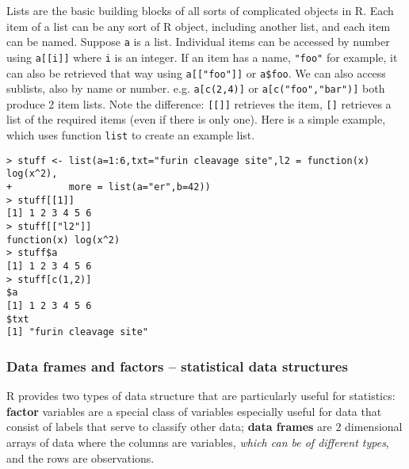 \documentclass[10pt] {article}
\theoremstyle{definition}
\begin{document}
Lists are the basic building blocks of all sorts of complicated objects in R. Each item of a list can be any sort of R object, including another list, and each item can be named. Suppose {\tt a} is a list. Individual items can be accessed by number using \lstinline+a[[i]]+ where {\tt i} is an integer. If an item has a name, \lstinline+"foo"+ for example, it can also be retrieved that way using \lstinline+a[["foo"]]+ or \lstinline+a$foo+. We can also access sublists, also by name or number. e.g. \lstinline+a[c(2,4)]+ or \lstinline+a[c("foo","bar")]+ both produce 2 item lists. Note the difference: \lstinline+[[]]+ retrieves the item, \lstinline+[]+ retrieves a list of the required items (even if there is only one). Here is a simple example, which uses function {\tt list} to create an example list.
\begin{lstlisting}
> stuff <- list(a=1:6,txt="furin cleavage site",l2 = function(x) log(x^2),
+          more = list(a="er",b=42))
> stuff[[1]]
[1] 1 2 3 4 5 6
> stuff[["l2"]]
function(x) log(x^2)
> stuff$a
[1] 1 2 3 4 5 6
> stuff[c(1,2)]
$a
[1] 1 2 3 4 5 6
$txt
[1] "furin cleavage site"
\end{lstlisting}  

\subsubsection{Data frames and factors -- statistical data structures \label{sec:factors}}

R provides two types of data structure that are particularly useful for statistics: {\bf factor} variables are a special class of variables especially useful for data that consist of labels that serve to classify other data; {\bf data frames} are 2 dimensional arrays of data where the columns are variables, {\em which can be of different types}, and the rows are observations. 
\end{document}
